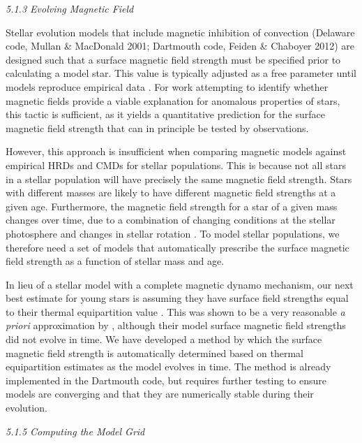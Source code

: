 {\it 5.1.3 Evolving Magnetic Field}


Stellar evolution models that include magnetic inhibition of convection (Delaware code, Mullan \& MacDonald 2001; Dartmouth code, Feiden \& Chaboyer 2012) are designed such that a surface magnetic field strength must be specified prior to calculating a model star. This value is typically adjusted as a free parameter until models reproduce empirical data \citep[e.g., radii of stars in EBs;][]{FC12b, FC13, FC14, MM14}. For work attempting to identify whether magnetic fields provide a viable explanation for anomalous properties of stars, this tactic is sufficient, as it yields a quantitative prediction for the surface magnetic field strength that can in principle be tested by observations. 

However, this approach is insufficient when comparing magnetic models against empirical HRDs and CMDs for stellar populations. This is because not all stars in a stellar population will have precisely the same magnetic field strength. Stars with different masses are likely to have different magnetic field strengths at a given age. Furthermore, the magnetic field strength for a star of a given mass changes over time, due to a combination of changing conditions at the stellar photosphere \citep[see, e.g.,][]{Feiden2016} and changes in stellar rotation \citep[e.g.,][]{Skumanich1972}. To model stellar populations, we therefore need a set of models that automatically prescribe the surface magnetic field strength as a function of stellar mass and age. 

In lieu of a stellar model with a complete magnetic dynamo mechanism, our next best estimate for young stars is assuming they have surface field strengths equal to their thermal equipartition value \citep{JohnsKrull1999}. This was shown to be a very reasonable {\it a priori} approximation by \citet{Feiden2016}, although their model surface magnetic field strengths did not evolve in time. We have developed a method by which the surface magnetic field strength is automatically determined based on thermal equipartition estimates as the model evolves in time. The method is already implemented in the Dartmouth code, but requires further testing to ensure models are converging and that they are numerically stable during their evolution. 

{\it 5.1.5 Computing the Model Grid}

